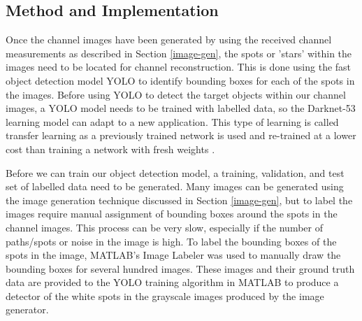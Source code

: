 
\subsection{Method and Implementation}

Once the channel images have been generated by using the received channel measurements as described in Section \ref{image-gen}, the spots or 'stars' within the images need to be located for channel reconstruction. This is done using the fast object detection model YOLO to identify bounding boxes for each of the spots in the images. Before using YOLO to detect the target objects within our channel images, a YOLO model needs to be trained with labelled data, so the Darknet-53 learning model can adapt to a new application. This type of learning is called transfer learning as a previously trained network is used and re-trained at a lower cost than training a network with fresh weights \cite{Burkov2019}.

Before we can train our object detection model, a training, validation, and test set of labelled data need to be generated. Many images can be generated using the image generation technique discussed in Section \ref{image-gen}, but to label the images require manual assignment of bounding boxes around the spots in the channel images. This process can be very slow, especially if the number of paths/spots or noise in the image is high. To label the bounding boxes of the spots in the image, MATLAB's Image Labeler was used to manually draw the bounding boxes for several hundred images. These images and their ground truth data are provided to the YOLO training algorithm in MATLAB to produce a detector of the white spots in the grayscale images produced by the image generator.

